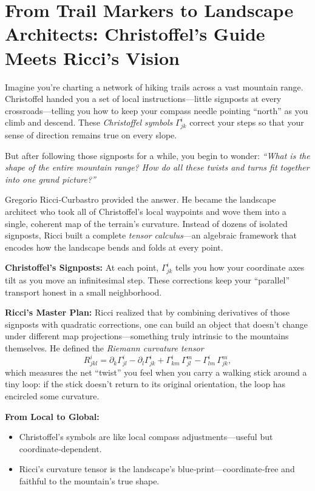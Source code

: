 \section{From Trail Markers to Landscape Architects: Christoffel’s Guide Meets Ricci’s Vision}

Imagine you’re charting a network of hiking trails across a vast mountain range.  Christoffel handed you a set of local instructions—little signposts at every crossroads—telling you how to keep your compass needle pointing “north” as you climb and descend.  These \emph{Christoffel symbols} \(\Gamma^i_{jk}\) correct your steps so that your sense of direction remains true on every slope.

But after following those signposts for a while, you begin to wonder: \emph{“What is the shape of the entire mountain range?  How do all these twists and turns fit together into one grand picture?”}  

Gregorio Ricci‐Curbastro provided the answer.  He became the landscape architect who took all of Christoffel’s local waypoints and wove them into a single, coherent map of the terrain’s curvature.  Instead of dozens of isolated signposts, Ricci built a complete \emph{tensor calculus}—an algebraic framework that encodes how the landscape bends and folds at every point.

\medskip
\noindent\textbf{Christoffel’s Signposts:}  
At each point, \(\Gamma^i_{jk}\) tells you how your coordinate axes tilt as you move an infinitesimal step.  These corrections keep your “parallel” transport honest in a small neighborhood.

\medskip
\noindent\textbf{Ricci’s Master Plan:}  
Ricci realized that by combining derivatives of those signposts with quadratic corrections, one can build an object that doesn’t change under different map projections—something truly intrinsic to the mountains themselves.  He defined the \emph{Riemann curvature tensor}
\[
R^i_{jkl}
= \partial_k \Gamma^i_{jl}
- \partial_l \Gamma^i_{jk}
+ \Gamma^i_{km}\,\Gamma^m_{jl}
- \Gamma^i_{lm}\,\Gamma^m_{jk},
\]
which measures the net “twist” you feel when you carry a walking stick around a tiny loop: if the stick doesn’t return to its original orientation, the loop has encircled some curvature.

\medskip
\noindent\textbf{From Local to Global:}  
\begin{itemize}
  \item Christoffel’s symbols are like local compass adjustments—useful but coordinate‐dependent.
  \item Ricci’s curvature tensor is the landscape’s blue‐print—coordinate‐free and faithful to the mountain’s true shape.
\end{itemize}

